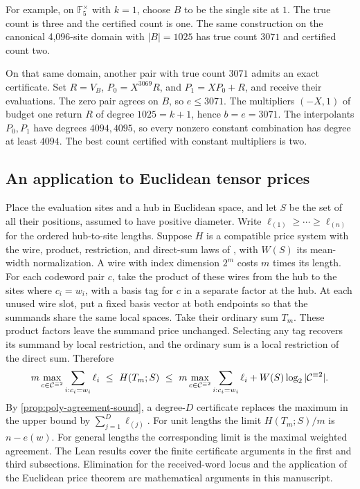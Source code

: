 For example, on \(\mathbb F_5^\times\) with \(k=1\), choose \(B\) to be
the single site at \(1\). The true count is three and the certified count
is one. The same construction on the canonical 4,096-site domain with
\(|B|=1025\) has true count \(3071\) and certified count two.

On that same domain, another pair with true count \(3071\) admits an exact
certificate. Set \(R=V_B\), \(P_0=X^{3069}R\), and \(P_1=XP_0+R\), and
receive their evaluations. The zero pair agrees on \(B\), so \(e\le3071\).
The multipliers \((-X,1)\) of budget one return \(R\) of degree
\(1025=k+1\), hence \(b=e=3071\). The interpolants \(P_0,P_1\) have degrees
\(4094,4095\), so every nonzero constant combination has degree at least
\(4094\). The best count certified with constant multipliers is two.

\subsection{An application to Euclidean tensor prices}

Place the evaluation sites and a hub in Euclidean space, and let \(S\) be
the set of all their positions, assumed to have positive diameter. Write
\(\ell_{(1)}\ge\cdots\ge\ell_{(n)}\) for the ordered hub-to-site lengths.
Suppose \(H\) is a compatible price system with the wire, product,
restriction, and direct-sum laws of \cite{openai2026euclideanTensorPrices},
with \(W(S)\) its mean-width normalization. A wire with index dimension
\(2^m\) costs \(m\) times its length. For each codeword pair \(c\), take the
product of these wires from the hub to the sites where \(c_i=w_i\), with
a basis tag for \(c\) in a separate factor at the hub. At each unused wire
slot, put a fixed basis vector at both endpoints so that the summands share
the same local spaces. Take their ordinary sum \(T_m\). These product
factors leave the summand price unchanged. Selecting any tag recovers its
summand by local restriction, and the ordinary sum is a local restriction
of the direct sum. Therefore
\[
  m\max_{c\in\mathcal C^{\equiv 2}}\sum_{i:c_i=w_i}\ell_i
    \ \le\ H(T_m;S)\ \le\
  m\max_{c\in\mathcal C^{\equiv 2}}\sum_{i:c_i=w_i}\ell_i
    +W(S)\log_2|\mathcal C^{\equiv 2}|.
\]
By \cref{prop:poly-agreement-sound}, a degree-\(D\) certificate replaces
the maximum in the upper bound by \(\sum_{j=1}^D\ell_{(j)}\).
For unit lengths the limit \(H(T_m;S)/m\) is \(n-e(w)\).
For general lengths the corresponding limit is the maximal weighted
agreement. The Lean results cover the finite certificate arguments in
the first and third subsections. Elimination for the received-word locus
and the application of the Euclidean price theorem are mathematical
arguments in this manuscript.
